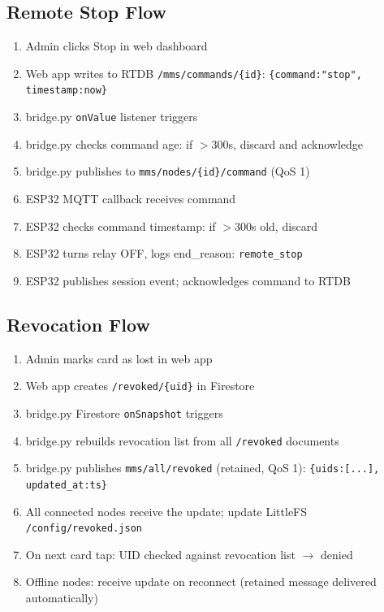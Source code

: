 \subsection{Remote Stop Flow}

\begin{enumerate}[leftmargin=1.5em]
    \item Admin clicks Stop in web dashboard
    \item Web app writes to RTDB \texttt{/mms/commands/\{id\}}: \texttt{\{command:"stop", timestamp:now\}}
    \item bridge.py \texttt{onValue} listener triggers
    \item bridge.py checks command age: if $>$300s, discard and acknowledge
    \item bridge.py publishes to \texttt{mms/nodes/\{id\}/command} (QoS 1)
    \item ESP32 MQTT callback receives command
    \item ESP32 checks command timestamp: if $>$300s old, discard
    \item ESP32 turns relay OFF, logs end\_reason: \texttt{remote\_stop}
    \item ESP32 publishes session event; acknowledges command to RTDB
\end{enumerate}

\subsection{Revocation Flow}

\begin{enumerate}[leftmargin=1.5em]
    \item Admin marks card as lost in web app
    \item Web app creates \texttt{/revoked/\{uid\}} in Firestore
    \item bridge.py Firestore \texttt{onSnapshot} triggers
    \item bridge.py rebuilds revocation list from all \texttt{/revoked} documents
    \item bridge.py publishes \texttt{mms/all/revoked} (retained, QoS 1): \texttt{\{uids:[...], updated\_at:ts\}}
    \item All connected nodes receive the update; update LittleFS \texttt{/config/revoked.json}
    \item On next card tap: UID checked against revocation list $\rightarrow$ denied
    \item Offline nodes: receive update on reconnect (retained message delivered automatically)
\end{enumerate}

